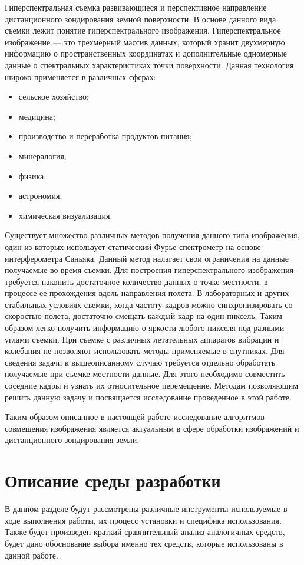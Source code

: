 \label{sec:intro}
Гиперспектральная съемка развивающиеся и перспективное направление дистанционного зондирования земной поверхности. В основе данного вида съемки лежит понятие гиперспектрального изображения. Гиперспектральное изображение --- это трехмерный массив данных, который хранит двухмерную информацию о пространственных координатах и дополнительные одномерные данные о спектральных характеристиках точки поверхности. Данная технология широко применяется в различных сферах:
\begin{itemize}
    \item сельское хозяйство;
    \item медицина;
    \item производство и переработка продуктов питания;
    \item минералогия;
    \item физика;
    \item астрономия;
    \item химическая визуализация.
\end{itemize}

Существует множество различных методов получения данного типа изображения, один из которых использует статический Фурье-спектрометр на основе интерферометра Саньяка. Данный метод налагает свои ограничения на данные получаемые во время съемки. Для построения гиперспектрального изображения требуется накопить достаточное количество данных о точке местности, в процессе ее прохождения вдоль направления полета. В лабораторных и других стабильных условиях съемки, когда частоту кадров можно синхронизировать со скоростью полета, достаточно смещать каждый кадр на один пиксель. Таким образом легко получить информацию о яркости любого пикселя под разными углами съемки. При съемке с различных летательных аппаратов вибрации и колебания не позволяют использовать методы применяемые в спутниках. Для сведения задачи к вышеописанному случаю требуется отдельно обработать получаемые при съемке местности данные. Для этого необходимо совместить соседние кадры и узнать их относительное перемещение. Методам позволяющим решить данную задачу и посвящается исследование проведенное в этой работе.

Таким образом описанное в настоящей работе исследование алгоритмов совмещения изображения является актуальным в сфере обработки изображений и дистанционного зондирования земли. 

\section{Описание среды разработки}
\label{sec:env_description}
В данном разделе будут рассмотрены различные инструменты используемые в ходе выполнения работы, их процесс установки и специфика использования. Также будет произведен краткий сравнительный анализ аналогичных средств, будет дано обоснование выбора именно тех средств, которые использованы в данной работе. 
